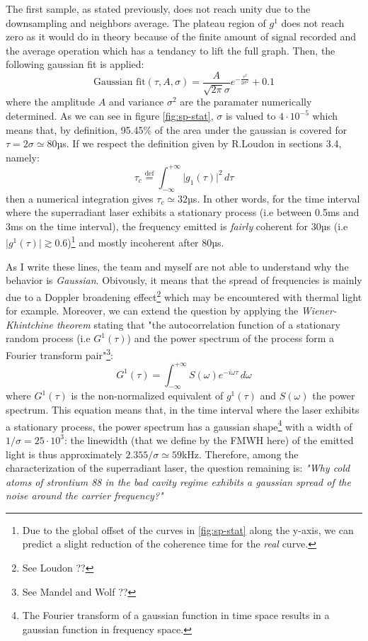 \documentclass[10pt]{report}
\begin{document}
The first sample, as stated previously, does not reach unity due to the downsampling and neighbors average. The plateau region of $g^1$ does not reach zero as it would do in theory because of the finite amount of signal recorded and the average operation which has a tendancy to lift the full graph. Then, the following gaussian fit is applied:
\begin{equation}
\textrm{Gaussian fit}(\tau, A, \sigma) = \frac{A}{\sqrt{2\pi}\sigma} e^{-\frac{\tau^2}{2\sigma^2}} + 0.1
\end{equation}
where the amplitude $A$ and variance $\sigma^2$ are the paramater numerically determined. As we can see in figure \ref{fig:sp-stat}, $\sigma$ is valued to $4\cdot10^{-5}$ which means that, by definition, 95.45\% of the area under the gaussian is covered for $\tau=2\sigma\simeq 80$µs. If we respect the definition given by R.Loudon in sections 3.4, namely:
\begin{equation}
\tau_c \stackrel{\text{def}}{=} \int_{-\infty}^{+\infty} \vert g_1(\tau) \vert^2 \, d\tau
\end{equation} 
then a numerical integration gives $\tau_c \simeq 32$µs. In other words, for the time interval where the superradiant laser exhibits a stationary process (i.e between 0.5ms and 3ms on the time interval), the frequency emitted is \textit{fairly} coherent for 30µs (i.e $\vert g^1(\tau) \vert \gtrsim 0.6$)\footnote{Due to the global offset of the curves in \ref{fig:sp-stat} along the y-axis, we can predict a slight reduction of the coherence time for the \textit{real} curve.} and mostly incoherent after 80µs.

As I write these lines, the team and myself are not able to understand why the behavior is \textit{Gaussian}. Obivously, it means that the spread of frequencies is mainly due to a Doppler broadening effect\footnote{See Loudon ??} which may be encountered with thermal light for example. Moreover, we can extend the question by applying the \textit{Wiener-Khintchine theorem} stating that "the autocorrelation function of a stationary random process (i.e $G^1(\tau)$) and the power spectrum of the process form a Fourier transform pair"\footnote{See Mandel and Wolf ??}:
\begin{equation}
G^1(\tau) = \int_{-\infty}^{+\infty} S(\omega) e^{-i\omega\tau} \,d\omega
\end{equation}
where $G^1(\tau)$ is the non-normalized equivalent of $g^1(\tau)$ and $S(\omega)$ the power spectrum. This equation means that, in the time interval where the laser exhibits a stationary process, the power spectrum has a gaussian shape\footnote{The Fourier transform of a gaussian function in time space results in a gaussian function in frequency space.} with a width of $1/\sigma = 25\cdot 10^{3}$: the linewidth (that we define by the FMWH here) of the emitted light is thus approximately $2.355/\sigma \simeq 59$kHz. Therefore, among the characterization of the superradiant laser, the question remaining is: \textit{"Why cold atoms of strontium 88 in the bad cavity regime exhibits a gaussian spread of the noise around the carrier frequency?"}
\end{document}
